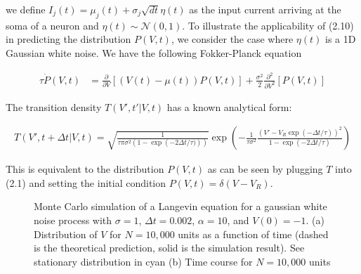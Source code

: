\documentclass{ucetd}
\begin{document}
we define $I_{j}(t) = \mu_{j}(t) + \sigma_{j}\sqrt{dt}\eta(t)$ as the input current arriving at the soma of a neuron and $\eta(t) \sim \mathcal{N}(0,1)$. To illustrate the applicability of (2.10) in predicting the distribution $P(V,t)$, we consider the case where $\eta(t)$ is a 1D Gaussian white noise. We have the following Fokker-Planck equation

\begin{align}
\tau\dot{P}(V,t) &= \frac{\partial}{\partial V}[\left(V(t)-\mu(t)\right) P(V,t)] + \frac{\sigma^{2}}{2}\frac{\partial^{2}}{\partial V^{2}}[P(V,t)]
\end{align}

The transition density $T(V',t'|V,t)$ has a known analytical form:

\begin{align*}
T(V',t+\Delta t|V,t) = \sqrt{\frac{1}{\tau\pi\sigma^{2}(1-\exp\left(-2\Delta t/\tau)\right))}}\exp\left(-\frac{1}{\tau\sigma^{2}}\frac{(V'-V_{R}\exp(-\Delta t/\tau))^{2}}{1-\exp\left(-2\Delta t/\tau\right)}\right)
\end{align*} 

This is equivalent to the distribution $P(V,t)$ as can be seen by plugging $T$ into (2.1) and setting the initial condition $P(V,t) = \delta(V-V_{R})$.

\begin{figure}
\centering
{}
\caption{Monte Carlo simulation of a Langevin equation for a gaussian white noise process with $\sigma = 1$, $\Delta t=0.002$, $\alpha=10$, and $V(0)=-1$. (a) Distribution of $V$ for $N=10,000$ units as a function of time (dashed is the theoretical prediction, solid is the simulation result). See stationary distribution in cyan (b) Time course for $N=10,000$ units}
\end{figure}
\end{document}
